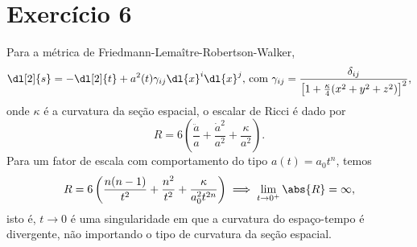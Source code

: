 \section*{Exercício 6}
Para a métrica de Friedmann-Lemaître-Robertson-Walker,
\begin{equation*}
    \dl[2]{s} = -\dl[2]{t} + a^2(t) \gamma_{ij} \dl{x}^i\dl{x}^j\text{, com }\gamma_{ij} = \frac{\delta_{ij}}{\left[1 + \frac{\kappa}4(x^2 + y^2 + z^2)\right]^2},
\end{equation*}
onde \(\kappa\) é a curvatura da seção espacial, o escalar de Ricci é dado por
\begin{equation*}
    R = 6\left(\frac{\ddot{a}}{a} + \frac{\dot{a}^2}{a^2} + \frac{\kappa}{a^2}\right).
\end{equation*}
Para um fator de escala com comportamento do tipo \(a(t) = a_0t^n\), temos
\begin{equation*}
    R = 6 \left(\frac{n(n-1)}{t^2} + \frac{n^2}{t^2} + \frac{\kappa}{a_0^2t^{2n}}\right) \implies \lim_{t \to 0^+} \abs{R} = \infty,
\end{equation*}
isto é, \(t \to 0\) é uma singularidade em que a curvatura do espaço-tempo é divergente, não importando o tipo de curvatura da seção espacial.
